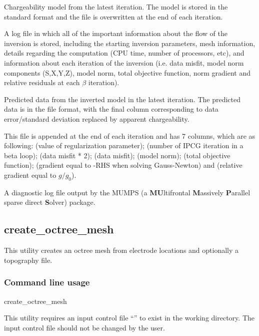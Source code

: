 \begin{description}[leftmargin=5cm, style=sameline, align=left]
\item[\fileName{inv.chg}] Chargeability model from the latest iteration. The model is stored in the standard  format and the file is overwritten at the end of each iteration. 
\item[\fileName{IP\_octree\_inv.txt}] A log file in which all of the important information about the flow of the inversion is stored, including the starting inversion parameters, mesh information, details regarding the computation (CPU time, number of processors, etc), and information about each iteration of the inversion (i.e. data misfit, model norm components (S,X,Y,Z), model norm, total objective function, norm gradient and relative residuals at each $\beta$ iteration).
\item[\fileName{dpred.txt}] Predicted data from the inverted model in the latest iteration. The predicted data is in the  file format, with the final column corresponding to data error/standard deviation replaced by apparent chargeability. 
\item[\fileName{IP\_octree\_inv.out}] This file is appended at the end of each iteration and has 7 columns, which are as following:  (value of regularization parameter);  (number of IPCG iteration in a beta loop);  (data misfit * 2);  (data misfit);  (model norm);  (total objective function); (gradient equal to -RHS when solving Gauss-Newton) and (relative gradient equal to $g/g_0$). 
\item[\fileName{mumps.txt}] A diagnostic log file output by the MUMPS (a \textbf{MU}ltifrontal \textbf{M}assively \textbf{P}arallel sparse direct \textbf{S}olver) package.
\end{description}


\subsection{create\_octree\_mesh}

This utility creates an octree mesh from electrode locations and optionally a topography file.

\subsubsection{Command line usage}
\begin{fileExample}
create\_octree\_mesh
\end{fileExample}
This utility requires an input control file ``'' to exist in the working directory. The input control file should not be changed by the user.
